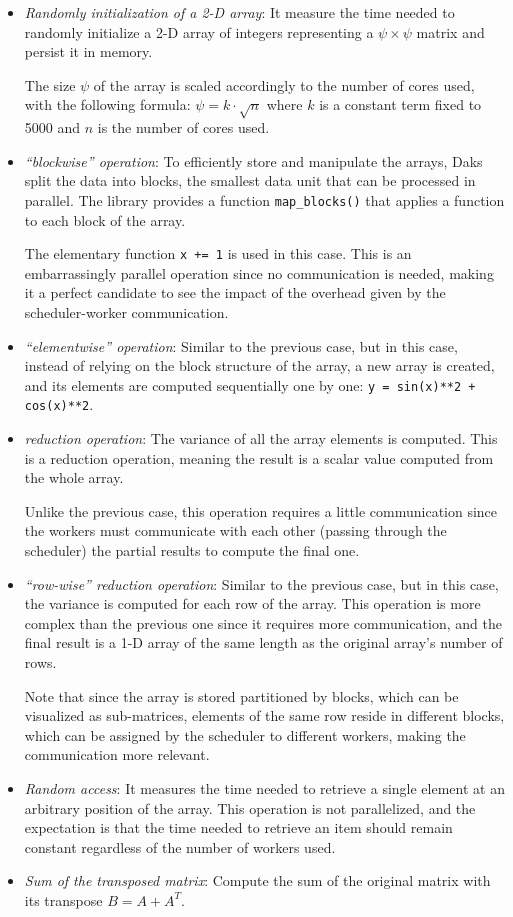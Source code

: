 \begin{itemize}
  \itemsep0em
  \item \textit{Randomly initialization of a 2-D array}: It measure the time
    needed to randomly initialize a 2-D array of integers representing a
    $\psi\times\psi$ matrix and persist it in memory.

    The size $\psi$ of the array is scaled accordingly to the number of cores
    used, with the following formula: $\psi = k \cdot \sqrt{n}$ where $k$ is a
    constant term fixed to 5000 and $n$ is the number of cores used.
  \item \textit{``blockwise'' operation}: To efficiently store and manipulate
    the arrays, Daks split the data into blocks, the smallest data unit that
    can be processed in parallel. The library provides a function
    \texttt{map\_blocks()} that applies a function to each block of the array.

    The elementary function \texttt{x += 1} is used in this case.
    This is an embarrassingly parallel operation since no communication is
    needed, making it a perfect candidate to see the impact of the overhead
    given by the scheduler-worker communication.
  \item \textit{``elementwise'' operation}: Similar to the previous case, but in
    this case, instead of relying on the block structure of the array, a new
    array is created, and its elements are computed sequentially one by one:
    \texttt{y = sin(x)**2 + cos(x)**2}.
  \item \textit{reduction operation}: The variance of all the array elements is
    computed. This is a reduction operation, meaning the result is a scalar
    value computed from the whole array.

    Unlike the previous case, this operation requires a little communication
    since the workers must communicate with each other (passing through the
    scheduler) the partial results to compute the final one.
 \item \textit{``row-wise'' reduction operation}: Similar to the previous case,
   but in this case, the variance is computed for each row of the array.
    This operation is more complex than the previous one since it requires more
    communication, and the final result is a 1-D array of the same length as the
    original array's number of rows.

    Note that since the array is stored partitioned by blocks, which can be
    visualized as sub-matrices, elements of the same row reside in different
    blocks, which can be assigned by the scheduler to different workers, making
    the communication more relevant.
  \item \textit{Random access}: It measures the time needed to retrieve a single
    element at an arbitrary position of the array. This operation is not
    parallelized, and the expectation is that the time needed to retrieve an
    item should remain constant regardless of the number of workers used.
  \item \textit{Sum of the transposed matrix}: Compute the sum of the original
    matrix with its transpose $B = A+A^T$.


\end{itemize}
